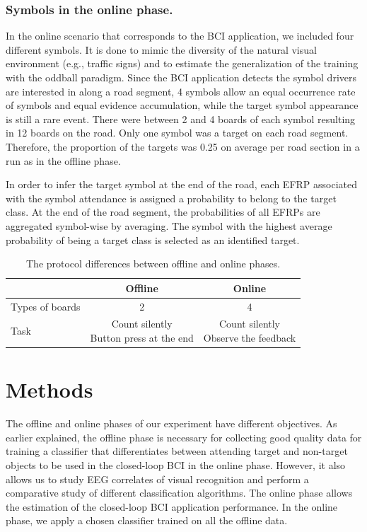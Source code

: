 \documentclass[12pt]{iopart}
\begin{document}
\subsubsection*{Symbols in the online phase.}
In the online scenario that corresponds to the BCI application, we included four different symbols. It is done to mimic the diversity of the natural visual environment (e.g., traffic signs) and to estimate the generalization of the training with the oddball paradigm. Since the BCI application detects the symbol drivers are interested in along a road segment, 4 symbols allow an equal occurrence rate of symbols and equal evidence accumulation, while the target symbol appearance is still a rare event. 
There were between 2 and 4 boards of each symbol resulting in 12 boards on the road.
Only one symbol was a target on each road segment. Therefore, the proportion
of the targets was 0.25 on average per road section in a run as in the offline phase.


In order to infer the target symbol at the end of the road, each EFRP associated with the
symbol attendance is assigned a probability to belong to the target class. 
At the end of the road segment, the probabilities
of all EFRPs are aggregated symbol-wise by averaging.
The symbol with the highest average probability of being a target class
is selected as an identified target.

\begin{table}
    \centering
    \caption{The protocol differences between offline and online phases.}
    \begin{tabular}{l | c | c}
        \hline 
        & Offline & Online \\
        \hline 
        Types of boards & 2 & 4 \\
        \hline
        Task & \shortstack{Count silently \\ Button press at the end} & \shortstack{Count silently \\ Observe the feedback} \\
        \hline 
    \end{tabular}
    \label{tab:OffOn}
\end{table}



\section{Methods}
\label{sec:methods}
The offline and online phases of our experiment have different objectives. As earlier explained, the offline phase is necessary for collecting good quality data for training a classifier that differentiates between attending target and non-target objects to be used in the closed-loop BCI in the online phase. However, it also allows us to study EEG correlates of visual recognition and perform a comparative study of different classification algorithms. The online phase allows the estimation of the closed-loop BCI application performance. In the online phase, we apply a chosen classifier trained on all the offline data. 
\end{document}
